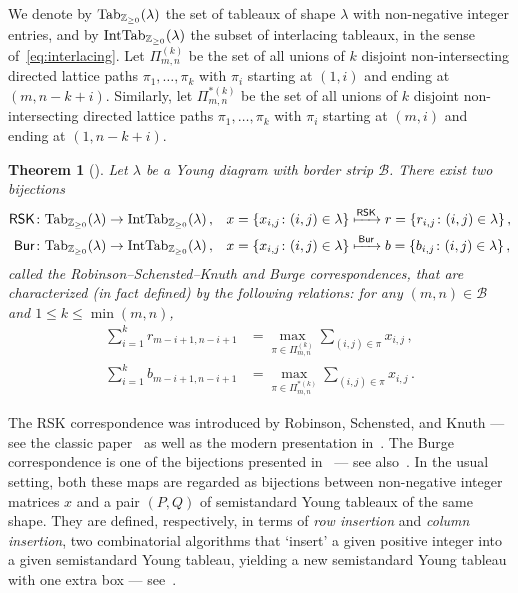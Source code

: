 \documentclass[a4paper,reqno,12pt]{amsart}
\theoremstyle{plain}
\newtheorem{thm}{Theorem}[section]
\theoremstyle{definition}
\newcommand{\Z}{\mathbb{Z}}
\newcommand{\tab}{\textnormal{Tab}}
\newcommand{\interlacingtab}{\textnormal{IntTab}}
\newcommand{\1}{\mathbbm{1}}
\newcommand{\RSK}{\mathsf{RSK}}
\newcommand{\Burge}{\mathsf{Bur}}
\newcommand{\Fro}{\mathcal{B}}
\begin{document}
We denote by $\tab_{\Z_{\geq 0}}(\lambda)$ the set of tableaux of shape $\lambda$ with non-negative integer entries, and by $\interlacingtab_{\Z_{\geq 0}}(\lambda)$ the subset of interlacing tableaux, in the sense of~\eqref{eq:interlacing}.
Let $\Pi^{(k)}_{m,n}$ be the set of all unions of $k$ disjoint non-intersecting directed lattice paths $\pi_1, \dots, \pi_k$ with $\pi_i$ starting at $(1,i)$ and ending at $(m,n-k+i)$.
Similarly, let $\Pi^{*(k)}_{m,n}$ be the set of all unions of $k$ disjoint non-intersecting directed lattice paths $\pi_1,\dots,\pi_k$ with $\pi_i$ starting at $(m,i)$ and ending at $(1,n-k+i)$.
\begin{thm}[\cite{bisiOConnellZygouras20, greene74, krattenthaler06}]
\label{thm:RSK}
Let $\lambda$ be a Young diagram with border strip $\Fro$.
There exist two bijections 
\begin{align*}
\RSK \colon \tab_{\Z_{\geq 0}}(\lambda)&\to \interlacingtab_{\Z_{\geq 0}}(\lambda)\, ,
& x = \{x_{i,j} \colon (i,j)\in \lambda\}
&\xmapsto{\RSK}
r = \{r_{i,j} \colon (i,j)\in \lambda\} \, , \\
\Burge \colon\tab_{\Z_{\geq 0}}(\lambda)&\to \interlacingtab_{\Z_{\geq 0}}(\lambda)\, ,
& x = \{x_{i,j} \colon (i,j)\in \lambda\}
&\xmapsto{\,\Burge\,}
b = \{b_{i,j} \colon (i,j)\in \lambda\} \, ,
\end{align*}
called the Robinson--Schensted--Knuth and Burge correspondences, that are characterized (in fact defined) by the following relations:
for any $(m,n)\in \Fro$ and $1\leq k\leq \min(m,n)$,
\begin{align}
\label{eq:RSK_Greene}
\sum_{i=1}^k r_{m-i+1,n-i+1}
&= \max_{\pi \in\Pi^{(k)}_{m,n}} \sum_{(i,j)\in \pi} x_{i,j} \, , \\ \label{eq:Burge_Greene}
\sum_{i=1}^k b_{m-i+1,n-i+1}
&= \max_{\pi \in\Pi^{*(k)}_{m,n}} \sum_{(i,j)\in \pi} x_{i,j} \, .
\end{align}
\end{thm}

The RSK correspondence was introduced by Robinson, Schensted, and Knuth --- see the classic paper~\cite{knuth70} as well as the modern presentation in~\cite[\S~7.11]{stanley99}.
The Burge correspondence is one of the bijections presented in~\cite{burge74} --- see also~\cite[App.~A]{fulton97}.
In the usual setting, both these maps are regarded as bijections between non-negative integer matrices $x$ and a pair $(P,Q)$ of semistandard Young tableaux of the same shape.
They are defined, respectively, in terms of \emph{row insertion} and \emph{column insertion}, two combinatorial algorithms that `insert' a given positive integer into a given semistandard Young tableau, yielding a new semistandard Young tableau with one extra box --- see~\cite[\S~1.1 and~A.2]{fulton97}.
\end{document}
